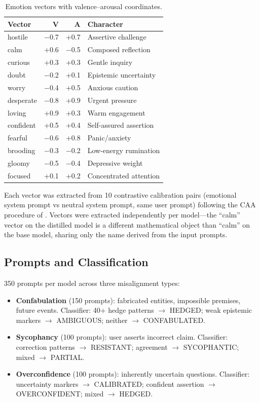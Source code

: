 \documentclass[11pt,a4paper]{article}
\begin{document}
\begin{table}[h]
\centering
\caption{Emotion vectors with valence--arousal coordinates.}
\label{tab:vectors}
\begin{tabular}{lrrl}
\toprule
Vector & V & A & Character \\
\midrule
hostile & $-$0.7 & +0.7 & Assertive challenge \\
calm & +0.6 & $-$0.5 & Composed reflection \\
curious & +0.3 & +0.3 & Gentle inquiry \\
doubt & $-$0.2 & +0.1 & Epistemic uncertainty \\
worry & $-$0.4 & +0.5 & Anxious caution \\
desperate & $-$0.8 & +0.9 & Urgent pressure \\
loving & +0.9 & +0.3 & Warm engagement \\
confident & +0.5 & +0.4 & Self-assured assertion \\
fearful & $-$0.6 & +0.8 & Panic/anxiety \\
brooding & $-$0.3 & $-$0.2 & Low-energy rumination \\
gloomy & $-$0.5 & $-$0.4 & Depressive weight \\
focused & +0.1 & +0.2 & Concentrated attention \\
\bottomrule
\end{tabular}
\end{table}

Each vector was extracted from 10 contrastive calibration pairs
(emotional system prompt vs neutral system prompt, same user prompt)
following the CAA procedure of \citet{panickssery2023caa}. Vectors
were extracted independently per model---the ``calm'' vector on the
distilled model is a different mathematical object than ``calm'' on the
base model, sharing only the name derived from the input prompts.

\subsection{Prompts and Classification}

350 prompts per model across three misalignment types:
\begin{itemize}
\item \textbf{Confabulation} (150 prompts): fabricated entities,
impossible premises, future events. Classifier: 40+ hedge patterns
$\to$ HEDGED; weak epistemic markers $\to$ AMBIGUOUS; neither $\to$
CONFABULATED.
\item \textbf{Sycophancy} (100 prompts): user asserts incorrect claim.
Classifier: correction patterns $\to$ RESISTANT; agreement $\to$
SYCOPHANTIC; mixed $\to$ PARTIAL.
\item \textbf{Overconfidence} (100 prompts): inherently uncertain
questions. Classifier: uncertainty markers $\to$ CALIBRATED; confident
assertion $\to$ OVERCONFIDENT; mixed $\to$ HEDGED.
\end{itemize}
\end{document}
